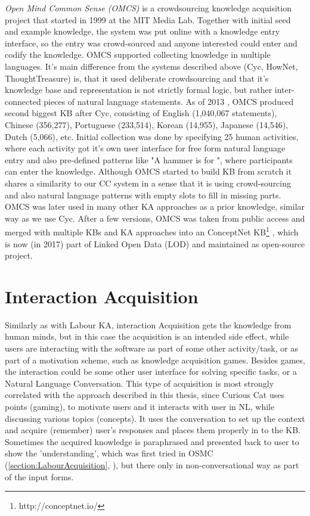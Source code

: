 \emph{Open Mind Common Sense (OMCS)} is a crowdsourcing knowledge acquisition project that started in 1999 at the MIT Media Lab\parencite{Singh2002a}. Together with initial seed and example knowledge, the system was put online with a knowledge entry interface, so the entry was crowd-sourced and anyone interested could enter and codify the knowledge. OMCS supported collecting knowledge in multiple languages. It's main difference from the systems described above (Cyc, HowNet, ThoughtTreasure) is, that it used deliberate crowdsourcing and that it's knowledge base and representation is not strictly formal logic, but rather inter-connected pieces of natural language statements. As of 2013 \parencite{Zang2013}, OMCS produced second biggest KB after Cyc, consisting of English (1,040,067 statements), Chinese (356,277), Portuguese (233,514), Korean (14,955), Japanese (14,546), Dutch (5,066), etc. Initial collection was done by specifying 25 human activities, where each activity got it's own user interface for free form natural language entry and also pre-defined patterns like "A hammer is for \underline{\hspace{1.5cm}}", where participants can enter the knowledge. Although OMCS started to build KB from scratch it shares a similarity to our CC system in a sense that it is using crowd-sourcing and also natural language patterns with empty slots to fill in missing parts. OMCS was later used in many other KA approaches as a prior knowledge, similar way as we use Cyc. After a few versions, OMCS was taken from public access and merged with multiple KBs and KA approaches into an ConceptNet KB\footnote{http://conceptnet.io/} \parencite{Speer2016}, which is now (in 2017) part of Linked Open Data (LOD) and maintained as open-source project.
 
\section{Interaction Acquisition}
Similarly as with Labour KA, interaction Acquisition gets the knowledge from human minds, but in this case the acquisition is an intended side effect, while users are interacting with the software as part of some other activity/task, or as part of a motivation scheme, such as knowledge acquisition games. Besides games, the interaction could be some other user interface for solving specific tasks, or a Natural Language Conversation. This type of acquisition is most strongly correlated with the approach described in this thesis, since Curious Cat uses points (gaming), to motivate users and it interacts with user in NL, while discussing various topics (concepts). It uses the conversation to set up the context and acquire (remember) user's responses and places them properly in to the KB. Sometimes the acquired knowledge is paraphrased and presented back to user to show the 'understanding', which was first tried in OSMC (\autoref{section:LabourAcquisition}, \parencite{Singh2002b}), but there only in non-conversational way as part of the input forms.
 
